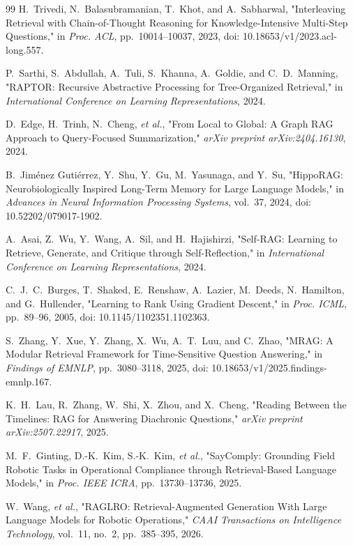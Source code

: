 \begin{thebibliography}{99}
H.~Trivedi, N.~Balasubramanian, T.~Khot, and A.~Sabharwal,
"Interleaving Retrieval with Chain-of-Thought Reasoning for Knowledge-Intensive Multi-Step Questions,"
in \emph{Proc. ACL}, pp.~10014--10037, 2023,
doi: 10.18653/v1/2023.acl-long.557.

P.~Sarthi, S.~Abdullah, A.~Tuli, S.~Khanna, A.~Goldie, and C.~D.~Manning,
"RAPTOR: Recursive Abstractive Processing for Tree-Organized Retrieval,"
in \emph{International Conference on Learning Representations}, 2024.

D.~Edge, H.~Trinh, N.~Cheng, \emph{et al.},
"From Local to Global: A Graph RAG Approach to Query-Focused Summarization,"
\emph{arXiv preprint arXiv:2404.16130}, 2024.

B.~Jim\'enez Guti\'errez, Y.~Shu, Y.~Gu, M.~Yasunaga, and Y.~Su,
"HippoRAG: Neurobiologically Inspired Long-Term Memory for Large Language Models,"
in \emph{Advances in Neural Information Processing Systems}, vol.~37, 2024,
doi: 10.52202/079017-1902.

A.~Asai, Z.~Wu, Y.~Wang, A.~Sil, and H.~Hajishirzi,
"Self-RAG: Learning to Retrieve, Generate, and Critique through Self-Reflection,"
in \emph{International Conference on Learning Representations}, 2024.

C.~J.~C.~Burges, T.~Shaked, E.~Renshaw, A.~Lazier, M.~Deeds, N.~Hamilton, and G.~Hullender,
"Learning to Rank Using Gradient Descent,"
in \emph{Proc. ICML}, pp.~89--96, 2005,
doi: 10.1145/1102351.1102363.

S.~Zhang, Y.~Xue, Y.~Zhang, X.~Wu, A.~T.~Luu, and C.~Zhao,
"MRAG: A Modular Retrieval Framework for Time-Sensitive Question Answering,"
in \emph{Findings of EMNLP}, pp.~3080--3118, 2025,
doi: 10.18653/v1/2025.findings-emnlp.167.

K.~H.~Lau, R.~Zhang, W.~Shi, X.~Zhou, and X.~Cheng,
"Reading Between the Timelines: RAG for Answering Diachronic Questions,"
\emph{arXiv preprint arXiv:2507.22917}, 2025.

M.~F.~Ginting, D.-K.~Kim, S.-K.~Kim, \emph{et al.},
"SayComply: Grounding Field Robotic Tasks in Operational Compliance through Retrieval-Based Language Models,"
in \emph{Proc. IEEE ICRA}, pp.~13730--13736, 2025.

W.~Wang, \emph{et al.},
"RAGLRO: Retrieval-Augmented Generation With Large Language Models for Robotic Operations,"
\emph{CAAI Transactions on Intelligence Technology}, vol.~11, no.~2, pp.~385--395, 2026.


\end{thebibliography}
